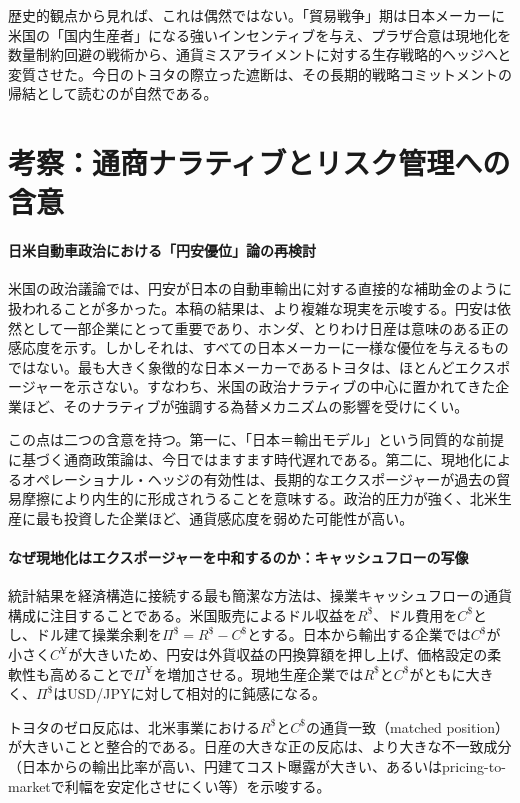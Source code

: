 \documentclass[12pt,a4paper]{article}
\begin{document}
歴史的観点から見れば、これは偶然ではない。「貿易戦争」期は日本メーカーに米国の「国内生産者」になる強いインセンティブを与え、プラザ合意は現地化を数量制約回避の戦術から、通貨ミスアライメントに対する生存戦略的ヘッジへと変質させた。今日のトヨタの際立った遮断は、その長期的戦略コミットメントの帰結として読むのが自然である。

\section{考察：通商ナラティブとリスク管理への含意}

\paragraph{日米自動車政治における「円安優位」論の再検討}

米国の政治議論では、円安が日本の自動車輸出に対する直接的な補助金のように扱われることが多かった。本稿の結果は、より複雑な現実を示唆する。円安は依然として一部企業にとって重要であり、ホンダ、とりわけ日産は意味のある正の感応度を示す。しかしそれは、すべての日本メーカーに一様な優位を与えるものではない。最も大きく象徴的な日本メーカーであるトヨタは、ほとんどエクスポージャーを示さない。すなわち、米国の政治ナラティブの中心に置かれてきた企業ほど、そのナラティブが強調する為替メカニズムの影響を受けにくい。

この点は二つの含意を持つ。第一に、「日本＝輸出モデル」という同質的な前提に基づく通商政策論は、今日ではますます時代遅れである。第二に、現地化によるオペレーショナル・ヘッジの有効性は、長期的なエクスポージャーが過去の貿易摩擦により内生的に形成されうることを意味する。政治的圧力が強く、北米生産に最も投資した企業ほど、通貨感応度を弱めた可能性が高い。

\paragraph{なぜ現地化はエクスポージャーを中和するのか：キャッシュフローの写像}

統計結果を経済構造に接続する最も簡潔な方法は、操業キャッシュフローの通貨構成に注目することである。米国販売によるドル収益を$R^{\$}$、ドル費用を$C^{\$}$とし、ドル建て操業余剰を$\Pi^{\$}=R^{\$}-C^{\$}$とする。日本から輸出する企業では$C^{\$}$が小さく$C^{\yen}$が大きいため、円安は外貨収益の円換算額を押し上げ、価格設定の柔軟性も高めることで$\Pi^{\yen}$を増加させる。現地生産企業では$R^{\$}$と$C^{\$}$がともに大きく、$\Pi^{\$}$はUSD/JPYに対して相対的に鈍感になる。

トヨタのゼロ反応は、北米事業における$R^{\$}$と$C^{\$}$の通貨一致（matched position）が大きいことと整合的である。日産の大きな正の反応は、より大きな不一致成分（日本からの輸出比率が高い、円建てコスト曝露が大きい、あるいはpricing-to-marketで利幅を安定化させにくい等）を示唆する。
\end{document}
